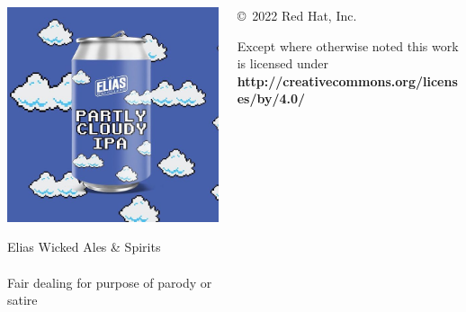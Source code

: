 \documentclass[ignorenonframetext,aspectratio=169,12pt]{beamer}
\begin{document}
\begin{frame}[plain]
\begin{columns}

  \begin{column}{.4\textwidth}
    \begin{center}
      \includegraphics[width=\textwidth]{img/elias.jpg}
    \end{center}
    \tiny Elias Wicked Ales \& Spirits
    \\ 
    \\ Fair dealing for purpose of parody or satire
  \end{column}

  \begin{column}{.6\textwidth}

    \setlength{\parskip}{.5em}

    { \centering

    

    \copyright~2022  Red Hat, Inc.

    { \scriptsize
    Except where otherwise noted this work is licensed under
    }
    { \footnotesize
    \textbf{http://creativecommons.org/licenses/by/4.0/}
    }

    }


\end{column}
\end{columns}
\end{frame}
\end{document}

